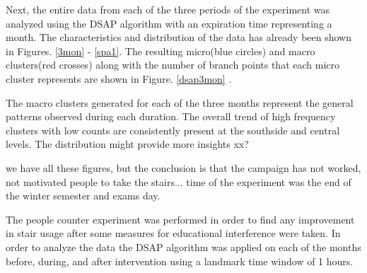 Next, the entire data from each of the three periods of the experiment was analyzed using the DSAP algorithm with an expiration time representing a month. The characteristics and distribution of the data has already been shown in Figures. \ref{3mon} - \ref{spa1}. The resulting micro(blue circles) and macro clusters(red crosses) along with the number of branch points that each micro cluster represents are shown in Figure. \ref{dsap3mon} .

The macro clusters generated for each of the three months represent the general patterns observed during each duration. The overall trend of high frequency clusters with low counts are consistently present at the southside and central levels. The distribution might provide more insights xx?

we have all these figures, but the conclusion is that the campaign has not worked, not motivated people to take the stairs... time of the experiment was the end of the winter semester and exams day.

The people counter experiment was performed in order to find any improvement in stair usage after some measures for educational interference were taken. In order to analyze the data the DSAP algorithm was applied on each of the months before, during, and after intervention using a landmark time window of 1 hours.


